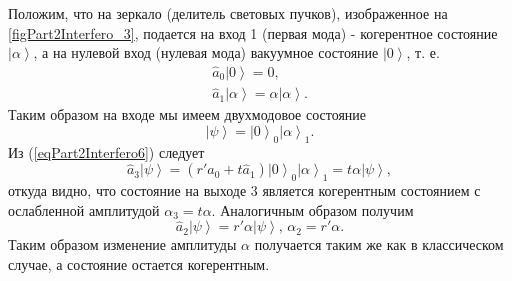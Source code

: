

Положим, что на зеркало (делитель световых пучков), изображенное на
\autoref{figPart2Interfero_3}, подается на вход 1 (первая мода) -
когерентное состояние $\left|\alpha\right>$, а на нулевой вход
(нулевая мода) вакуумное состояние $\left|0\right>$, т. е.
\begin{eqnarray}
\hat{a}_0 \left|0\right> = 0,
\nonumber \\
\hat{a}_1 \left|\alpha\right> = \alpha \left|\alpha\right>.
\nonumber
\end{eqnarray}
Таким образом на входе мы имеем двухмодовое состояние 
\[
\left|\psi\right> = \left|0\right>_0 \left|\alpha\right>_1.
\]
Из (\ref{eqPart2Interfero6}) следует 
\begin{equation}
\hat{a}_3\left|\psi\right> = 
\left(r' \hat{a}_0 + t \hat{a}_1\right)\left|0\right>_0
\left|\alpha\right>_1 = 
t \alpha \left|\psi\right>,
\nonumber
\end{equation}
откуда видно, что состояние на выходе 3 является когерентным состоянием
с ослабленной амплитудой $\alpha_3 = t \alpha$. 
Аналогичным образом получим
\begin{equation}
\hat{a}_2\left|\psi\right> = 
r' \alpha \left|\psi\right>, \, \alpha_2 = r'\alpha.
\label{eqPart2InterferoTask3}
\end{equation}
Таким образом изменение амплитуды $\alpha$ получается таким же как в
классическом случае, а состояние остается когерентным.

